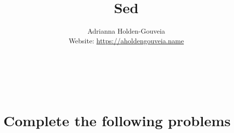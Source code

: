 \documentclass[12pt]{article}
\title{Sed}
\author{
        Adrianna Holden-Gouveia \\
        Website: \url{https://aholdengouveia.name}\\ 
        \date{\vspace{-5ex}}
        \faLinkedin{: aholdengouveia} \\
        \faGithub {: aholdengouveia} \\
        \faTwitter {: aholdengouveia} \\
        }
\begin{document}
    

\maketitle


\section*{Complete the following problems}
\end{document}
